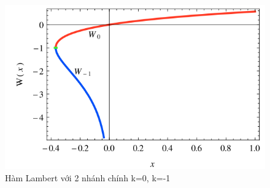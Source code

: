 \begin{figure}[h]
	\centering
	\includegraphics[scale=0.7]{hinh/Screenshot_1}
	\caption{Hàm Lambert với 2 nhánh chính k=0, k=-1}
	\label{fig1}
\end{figure}

